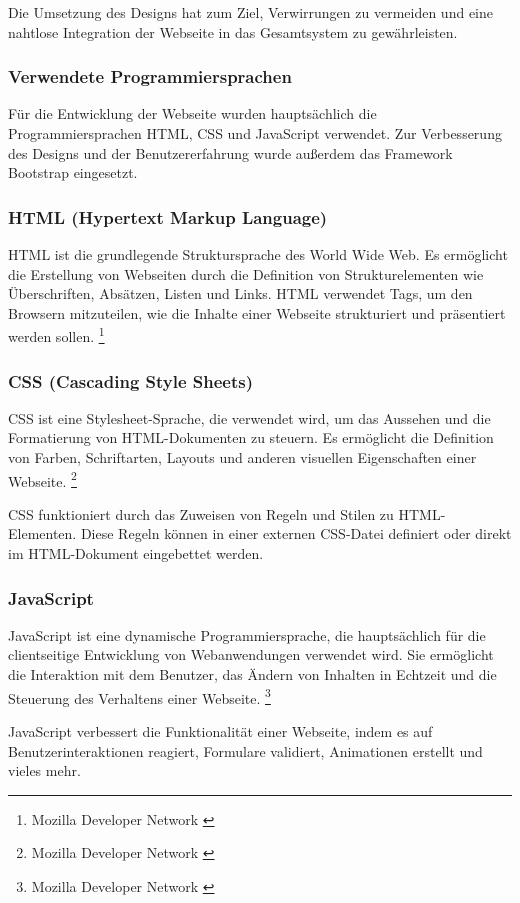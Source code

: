 Die Umsetzung des Designs hat zum Ziel, Verwirrungen zu vermeiden und eine nahtlose Integration der Webseite in das
Gesamtsystem zu gewährleisten.

\subsubsection{Verwendete Programmiersprachen}
Für die Entwicklung der Webseite wurden hauptsächlich die Programmiersprachen HTML, CSS und JavaScript verwendet. Zur
Verbesserung des Designs und der Benutzererfahrung wurde außerdem das Framework Bootstrap eingesetzt.

\subsubsection*{HTML (Hypertext Markup Language)}
HTML ist die grundlegende Struktursprache des World Wide Web. Es ermöglicht die Erstellung von Webseiten durch die
Definition von Strukturelementen wie Überschriften, Absätzen, Listen und Links. HTML verwendet Tags, um den Browsern
mitzuteilen, wie die Inhalte einer Webseite strukturiert und präsentiert werden sollen. \footnote{Mozilla Developer Network \cite{HTML}}

\subsubsection*{CSS (Cascading Style Sheets)}
CSS ist eine Stylesheet-Sprache, die verwendet wird, um das Aussehen und die Formatierung von HTML-Dokumenten zu steuern.
Es ermöglicht die Definition von Farben, Schriftarten, Layouts und anderen visuellen Eigenschaften einer Webseite. \footnote{Mozilla Developer Network \cite{CSS}}

CSS funktioniert durch das Zuweisen von Regeln und Stilen zu HTML-Elementen. Diese Regeln können in einer externen
CSS-Datei definiert oder direkt im HTML-Dokument eingebettet werden.

\subsubsection*{JavaScript}
JavaScript ist eine dynamische Programmiersprache, die hauptsächlich für die clientseitige Entwicklung von Webanwendungen
verwendet wird. Sie ermöglicht die Interaktion mit dem Benutzer, das Ändern von Inhalten in Echtzeit und die Steuerung
des Verhaltens einer Webseite. \footnote{Mozilla Developer Network \cite{Javascript}}

JavaScript verbessert die Funktionalität einer Webseite, indem es auf Benutzerinteraktionen reagiert, Formulare validiert,
Animationen erstellt und vieles mehr.

